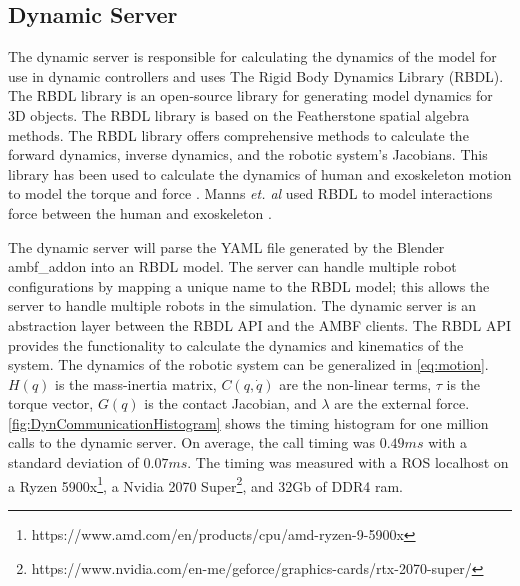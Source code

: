  



 
 
 
 
 \subsection{Dynamic Server}
 The dynamic server is responsible for calculating the dynamics of the model for use in dynamic controllers and uses The Rigid Body Dynamics Library (RBDL)\cite{Felis2016}. The RBDL library is an open-source library for generating model dynamics for 3D objects. The RBDL library is based on the Featherstone spatial algebra methods. The RBDL library offers comprehensive methods to calculate the forward dynamics, inverse dynamics, and the robotic system's Jacobians. This library has been used to calculate the dynamics of human and exoskeleton motion to model the torque and force \cite{millard2017predicting} \cite{harant2017parameter}. Manns \textit{et. al} used RBDL to model interactions force between the human and exoskeleton \cite{manns2017motion}. 
 
 The dynamic server will parse the YAML file generated by the Blender ambf\_addon into an RBDL model. The server can handle multiple robot configurations by mapping a unique name to the RBDL model; this allows the server to handle multiple robots in the simulation. 
 The dynamic server is an abstraction layer between the RBDL API and the AMBF clients. The RBDL API provides the functionality to calculate the dynamics and kinematics of the system. The dynamics of the robotic system can be generalized in  \autoref{eq:motion}. $H(q)$ is the mass-inertia matrix, $C(q,\Dot{q})$ are the non-linear terms, $\tau$ is the torque vector,  $G(q)$ is the contact Jacobian, and $\lambda$ are the external force. \autoref{fig:DynCommunicationHistogram} shows the timing histogram for one million calls to the dynamic server. On average, the call timing was $0.49ms$ with a standard deviation of $0.07ms$. The timing was measured with a ROS localhost on a Ryzen 5900x\footnote{https://www.amd.com/en/products/cpu/amd-ryzen-9-5900x}, a Nvidia 2070 Super\footnote{https://www.nvidia.com/en-me/geforce/graphics-cards/rtx-2070-super/}, and 32Gb of DDR4 ram.  


